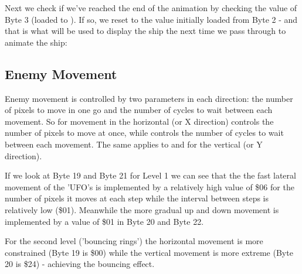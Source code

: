 %


Next we check if we've reached the end of the animation by checking the value
of Byte 3 (loaded to ).  If so,
we reset  to the value initially
loaded from Byte 2 - and that is what will be used to display the ship the next
time we pass through to animate the ship:

%


\subsection{Enemy Movement}

Enemy movement is controlled by two parameters in each direction: the number of pixels to move in one go and the number of
cycles to wait between each movement. So for movement in the horizontal (or X direction)  controls the number
of pixels to move at once, while  controls the number of cycles to wait between each movement. The same
applies to  and  for the vertical (or Y direction).

If we look at Byte 19 and Byte 21 for Level 1 we can see that the the fast lateral movement of the 'UFO's is implemented by a relatively
high value of \$06 for the number of pixels it moves at each step while the interval between steps is relatively low (\$01).
Meanwhile the more gradual up and down movement is implemented by a value of \$01 in Byte 20 and Byte 22.

For the second level ('bouncing rings') the horizontal movement is more constrained (Byte 19 is \$00) while the vertical movement
is more extreme (Byte 20 is \$24) - achieving the bouncing effect.



